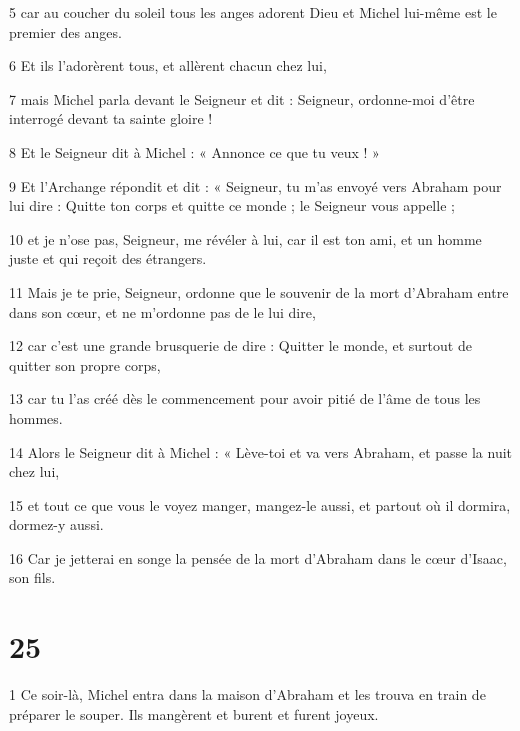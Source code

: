 \par 5 car au coucher du soleil tous les anges adorent Dieu et Michel lui-même est le premier des anges.

\par 6 Et ils l'adorèrent tous, et allèrent chacun chez lui,

\par 7 mais Michel parla devant le Seigneur et dit : Seigneur, ordonne-moi d'être interrogé devant ta sainte gloire !

\par 8 Et le Seigneur dit à Michel : « Annonce ce que tu veux ! »

\par 9 Et l'Archange répondit et dit : « Seigneur, tu m'as envoyé vers Abraham pour lui dire : Quitte ton corps et quitte ce monde ; le Seigneur vous appelle ;

\par 10 et je n'ose pas, Seigneur, me révéler à lui, car il est ton ami, et un homme juste et qui reçoit des étrangers.

\par 11 Mais je te prie, Seigneur, ordonne que le souvenir de la mort d'Abraham entre dans son cœur, et ne m'ordonne pas de le lui dire,

\par 12 car c'est une grande brusquerie de dire : Quitter le monde, et surtout de quitter son propre corps,

\par 13 car tu l'as créé dès le commencement pour avoir pitié de l'âme de tous les hommes.

\par 14 Alors le Seigneur dit à Michel : « Lève-toi et va vers Abraham, et passe la nuit chez lui,

\par 15 et tout ce que vous le voyez manger, mangez-le aussi, et partout où il dormira, dormez-y aussi.

\par 16 Car je jetterai en songe la pensée de la mort d'Abraham dans le cœur d'Isaac, son fils.

\chapter{25}

\par 1 Ce soir-là, Michel entra dans la maison d'Abraham et les trouva en train de préparer le souper. Ils mangèrent et burent et furent joyeux.

